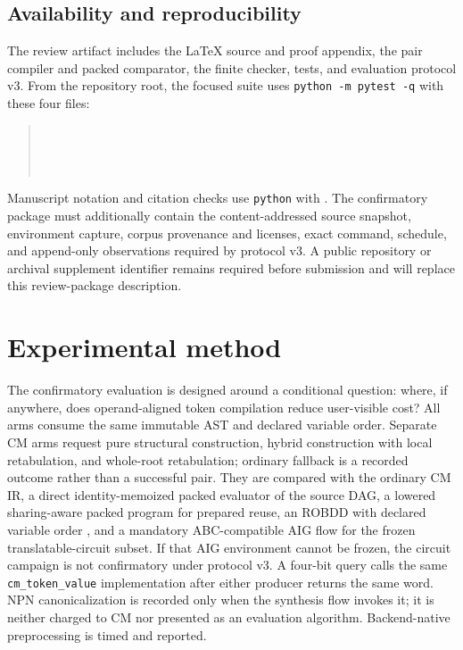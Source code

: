 \documentclass[11pt]{article}
\begin{document}
\subsection{Availability and reproducibility}

The review artifact includes the LaTeX source and proof appendix, the pair
compiler and packed comparator, the finite checker, tests, and evaluation
protocol v3. From the repository root, the focused suite uses
\texttt{python -m pytest -q} with these four files:
\begin{quote}\small
  \\
  \\
  \\
\end{quote}
Manuscript notation and citation checks use \texttt{python} with
. The
confirmatory package must additionally contain the content-addressed source
snapshot, environment capture, corpus provenance and licenses, exact command,
schedule, and append-only observations required by protocol v3. A public
repository or archival supplement identifier remains required before
submission and will replace this review-package description.

\relatedworksection
\logicalmatrixsection

\section{Experimental method}
\label{sec:experiments}

The confirmatory evaluation is designed around a conditional question: where,
if anywhere, does operand-aligned token compilation reduce user-visible cost?
All arms consume the same immutable AST and declared variable order. Separate
CM arms request pure structural construction, hybrid construction with local
retabulation, and whole-root retabulation; ordinary fallback is a recorded
outcome rather than a successful pair. They are compared with the ordinary CM
IR, a direct identity-memoized packed evaluator of the source DAG, a lowered
sharing-aware packed program for prepared reuse, an ROBDD with declared
variable order \citep{bryant1986}, and a mandatory ABC-compatible AIG flow for
the frozen translatable-circuit subset. If that AIG environment cannot be
frozen, the circuit campaign is not confirmatory under protocol v3. A four-bit
query calls the same \texttt{cm\_token\_value} implementation after either
producer returns the same word. NPN canonicalization is recorded only when the
synthesis flow invokes it; it is neither charged to CM nor presented as an
evaluation algorithm. Backend-native preprocessing is timed and reported.
\end{document}
